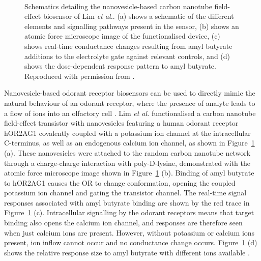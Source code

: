 \documentclass[
  a4paper,
]{scrbook}
\begin{document}
\begin{figure}
\begin{minipage}[t]{0.45\linewidth}
{{}

}

\end{minipage}%
%
\begin{minipage}[t]{0.01\linewidth}

{\centering 

~

}

\end{minipage}%

\caption{\label{fig-lim-ion-channel}Schematics detailing the
nanovesicle-based carbon nanotube field-effect biosensor of Lim \emph{et
al.}. (a) shows a schematic of the different elements and signalling
pathways present in the sensor, (b) shows an atomic force microscope
image of the functionalised device, (c) shows real-time conductance
changes resulting from amyl butyrate additions to the electrolyte gate
against relevant controls, and (d) shows the dose-dependent response
pattern to amyl butyrate. Reproduced with permission from
\autocite{Lim2015}.}

\end{figure}

Nanovesicle-based odorant receptor biosensors can be used to directly
mimic the natural behaviour of an odorant receptor, where the presence
of analyte leads to a flow of ions into an olfactory cell
\autocite{Lim2015,Dung2018}. Lim \emph{et al.} functionalised a carbon
nanotube field-effect transistor with nanovesicles featuring a human
odorant receptor hOR2AG1 covalently coupled with a potassium ion channel
at the intracellular C-terminus, as well as an endogenous calcium ion
channel, as shown in Figure~\ref{fig-lim-ion-channel} (a). These
nanovesicles were attached to the random carbon nanotube network through
a charge-charge interaction with poly-D-lysine, demonstrated with the
atomic force microscope image shown in Figure~\ref{fig-lim-ion-channel}
(b). Binding of amyl butyrate to hOR2AG1 causes the OR to change
conformation, opening the coupled potassium ion channel and gating the
transistor channel. The real-time signal responses associated with amyl
butyrate binding are shown by the red trace in
Figure~\ref{fig-lim-ion-channel} (c). Intracellular signalling by the
odorant receptors means that target binding also opens the calcium ion
channel, and responses are therefore seen when just calcium ions are
present. However, without potassium or calcium ions present, ion inflow
cannot occur and no conductance change occurs.
Figure~\ref{fig-lim-ion-channel} (d) shows the relative response size to
amyl butyrate with different ions available \autocite{Lim2015}.
\end{document}
